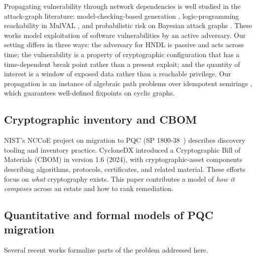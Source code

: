 \documentclass[conference]{IEEEtran}
\begin{document}
Propagating vulnerability through network dependencies is well studied in the attack-graph literature: model-checking-based generation \cite{sheyner2002}, logic-programming reachability in MulVAL \cite{ou2005}, and probabilistic risk on Bayesian attack graphs \cite{poolsappasit2012}. These works model exploitation of software vulnerabilities by an active adversary. Our setting differs in three ways: the adversary for HNDL is passive and acts across time; the vulnerability is a property of cryptographic configuration that has a time-dependent break point rather than a present exploit; and the quantity of interest is a window of exposed data rather than a reachable privilege. Our propagation is an instance of algebraic path problems over idempotent semirings \cite{carre1979,mohri2002}, which guarantees well-defined fixpoints on cyclic graphs.

\subsection{Cryptographic inventory and CBOM}\label{sec:2.4}

NIST's NCCoE project on migration to PQC (SP 1800-38~\cite{nist-sp1800-38}) describes discovery tooling and inventory practice. CycloneDX introduced a Cryptographic Bill of Materials (CBOM) in version 1.6 (2024), with cryptographic-asset components describing algorithms, protocols, certificates, and related material. These efforts focus on \emph{what} cryptography exists. This paper contributes a model of \emph{how it composes} across an estate and how to rank remediation.

\subsection{Quantitative and formal models of PQC migration}\label{sec:2.5}

Several recent works formalize parts of the problem addressed here.
\end{document}
